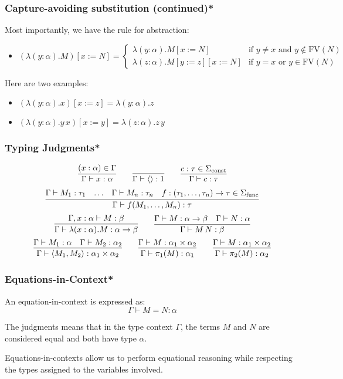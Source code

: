 \documentclass[aspectratio=169]{beamer}
\begin{document}
\begin{frame}
\frametitle{Capture-avoiding substitution (continued)*}

Most importantly, we have the rule for abstraction:

\begin{itemize}
    \item $(\lambda (y : \alpha). M)[x := N] =
    \begin{cases}
    \lambda (y : \alpha). M[x := N] & \text{if } y \neq x \text{ and } y \notin \text{FV}(N) \\
    \lambda (z : \alpha). M[y := z][x := N] & \text{if } y = x \text{ or } y \in \text{FV}(N)
    \end{cases}$
\end{itemize}
\pause
Here are two examples:
\begin{itemize}
    \item $(\lambda (y : \alpha). x)[x := z] = \lambda (y : \alpha). z$
    \item $(\lambda (y : \alpha). y \, x)[x := y] = \lambda (z : \alpha). z \, y$
\end{itemize}

\end{frame}

\begin{frame}
\frametitle{Typing Judgments*}

\[
\infer{\Gamma \vdash x : \alpha}{(x : \alpha) \in \Gamma}
\qquad
\infer{\Gamma \vdash \langle \rangle : 1}{}
\qquad
\infer{\Gamma \vdash c : \tau}{c : \tau \in \Sigma_{\text{const}}}
\]
\pause
\[
\infer{\Gamma \vdash f(M_1, \ldots, M_n) : \tau}{\Gamma \vdash M_1 : \tau_1 & \ldots & \Gamma \vdash M_n : \tau_n & f : (\tau_1, \ldots, \tau_n) \rightarrow \tau \in \Sigma_{\text{func}}}
\]
\pause
\[
\infer{\Gamma \vdash \lambda (x : \alpha). M : \alpha \rightarrow \beta}{\Gamma, x : \alpha \vdash M : \beta}
\qquad
\infer{\Gamma \vdash M \, N : \beta}{\Gamma \vdash M : \alpha \rightarrow \beta & \Gamma \vdash N : \alpha}
\]
\pause
\[
\infer{\Gamma \vdash \langle M_1, M_2 \rangle : \alpha_1 \times \alpha_2}{\Gamma \vdash M_1 : \alpha & \Gamma \vdash M_2 : \alpha_2}
\qquad
\infer{\Gamma \vdash \pi_1(M) : \alpha_1}{\Gamma \vdash M : \alpha_1 \times \alpha_2}
\qquad
\infer{\Gamma \vdash \pi_2(M) : \alpha_2}{\Gamma \vdash M : \alpha_1 \times \alpha_2}
\]
\end{frame}

\begin{frame}
\frametitle{Equations-in-Context*}

An equation-in-context is expressed as:
\[
\Gamma \vdash M = N : \alpha
\]

The judgments means that in the type context $\Gamma$, the terms $M$ and $N$ are considered equal and both have type $\alpha$.

\medskip

Equations-in-contexts allow us to perform equational reasoning while respecting the types assigned to the variables involved.

\end{frame}
\end{document}
